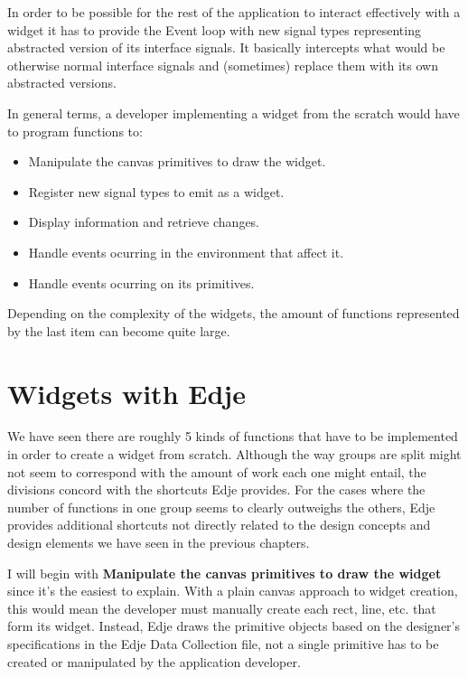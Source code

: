 \documentclass[12pt,a4paper,english]{book}
\begin{document}
In order to be possible for the rest of the application to interact effectively
with a widget it has to provide the Event loop with new signal types
representing abstracted version of its interface signals. It basically
intercepts what would be otherwise normal interface signals and (sometimes)
replace them with its own abstracted versions.

In general terms, a developer implementing a widget from the scratch would have
to program functions to:
\begin{itemize}
\item {} 
Manipulate the canvas primitives to draw the widget.

\item {} 
Register new signal types to emit as a widget.

\item {} 
Display information and retrieve changes.

\item {} 
Handle events ocurring in the environment that affect it.

\item {} 
Handle events ocurring on its primitives.

\end{itemize}

Depending on the complexity of the widgets, the amount of functions represented
by the last item can become quite large.



\hypertarget{widgets-with-edje}{}
\section{Widgets with Edje}

We have seen there are roughly 5 kinds of functions that have to be implemented
in order to create a widget from scratch. Although the way groups are split
might not seem to correspond with the amount of work each one might entail, the
divisions concord with the shortcuts Edje provides. For the cases where
the number of functions in one group seems to clearly outweighs the others,
Edje provides additional shortcuts not directly related to the design concepts
and design elements we have seen in the previous chapters.

I will begin with \textbf{Manipulate the canvas primitives to draw the widget} since
it's the easiest to explain. With a plain canvas approach to widget creation,
this would mean the developer must manually create each rect, line, etc. that
form its widget. Instead, Edje draws the primitive objects based on the
designer's  specifications in the Edje Data Collection file, not a single
primitive has to be created or manipulated by the application developer.
\end{document}
